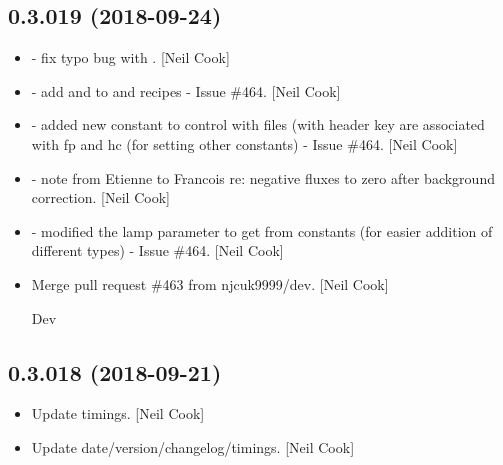 \documentclass[a4paper,10pt,english]{report}
\begin{document}
\subsection{0.3.019 (2018-09-24)}
\label{\detokenize{misc/changelog:id313}}\begin{itemize}
\item {} 
 - fix typo bug with
. {[}Neil Cook{]}

\item {} 
 - add  and  to  and
 recipes - Issue \#464. {[}Neil Cook{]}

\item {} 
 - added new constant to control with files
(with header key  are associated with fp and hc (for
setting other constants) - Issue \#464. {[}Neil Cook{]}

\item {} 
 - note from Etienne to Francois re: negative
fluxes to zero after background correction. {[}Neil Cook{]}

\item {} 
 - modified the lamp parameter to get from
constants (for easier addition of different types) - Issue \#464. {[}Neil
Cook{]}

\item {} 
Merge pull request \#463 from njcuk9999/dev. {[}Neil Cook{]}

Dev

\end{itemize}


\subsection{0.3.018 (2018-09-21)}
\label{\detokenize{misc/changelog:id314}}\begin{itemize}
\item {} 
Update timings. {[}Neil Cook{]}

\item {} 
Update date/version/changelog/timings. {[}Neil Cook{]}

\end{itemize}
\end{document}

